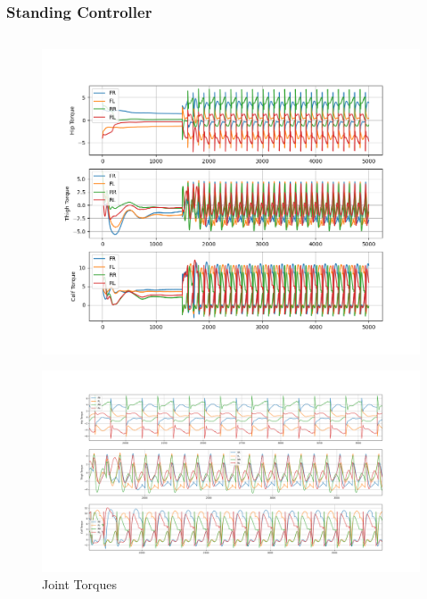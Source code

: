 \documentclass{beamer}
\begin{document}
\begin{frame}
    \frametitle{Standing Controller}
    \begin{columns}[onlytextwidth, T]
        \begin{column}{.5\textwidth}
            \begin{figure}
                \includegraphics[height=0.3\textheight]{../images/w_torque.png}
            \end{figure}
            \vspace{-0.9cm}
            \begin{figure}
                \includegraphics[height=0.4\textheight, width=\textwidth]{../images/zoom_torque.png}
                \caption{Joint Torques}
            \end{figure}
            

\end{column}
\end{columns}
\end{frame}
\end{document}
